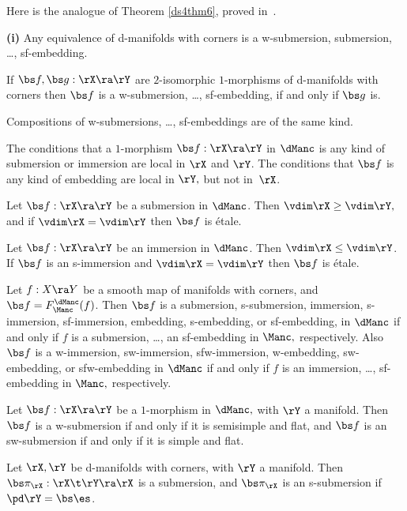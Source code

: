 \documentclass{article}
\begin{document}
Here is the analogue of Theorem \ref{ds4thm6}, proved in~\cite[\S
7.5]{Joyc6}.

\begin{thm}{\bf(i)} Any equivalence of d-manifolds with corners
is a w-sub\-mer\-sion, submersion, \ldots, sf-embedding.
\smallskip

 If\/ $\bs f,\bs g:\rX\ra\rY$ are $2$-isomorphic
$1$-morphisms of d-manifolds with corners then $\bs f$ is a
w-submersion, \ldots, sf-embedding, if and only if\/ $\bs g$ is.
\smallskip

 Compositions of w-submersions, \ldots,
sf-embeddings are of the same kind.
\smallskip

 The conditions that a $1$-morphism\/ $\bs
f:\rX\ra\rY$ in $\dManc$ is any kind of submersion or immersion are
local in $\rX$ and\/ $\rY$. The conditions that\/ $\bs f$ is any
kind of embedding are local in $\rY,$ but not in\/~$\rX$.
\smallskip

 Let\/ $\bs f:\rX\ra\rY$ be a submersion in
$\dManc$. Then\/ $\vdim\rX\ge\vdim\rY,$ and if\/ $\vdim\rX=\vdim\rY$
then\/ $\bs f$ is \'etale.
\smallskip

 Let\/ $\bs f:\rX\ra\rY$ be an immersion in
$\dManc$. Then $\vdim\rX\le\vdim\rY$. If\/ $\bs f$ is an s-immersion
and\/ $\vdim\rX=\vdim\rY$ then\/ $\bs f$ is \'etale.
\smallskip

 Let\/ $f:X\ra Y$ be a smooth map of manifolds
with corners, and\/ $\bs f=F_\Manc^\dManc(f)$. Then $\bs f$ is a
submersion, s-submersion, immersion, s-immersion, sf-immersion,
embedding, s-embedding, or sf-embedding, in $\dManc$ if and only
if\/ $f$ is a submersion, \ldots, an sf-embedding in $\Manc,$
respectively. Also $\bs f$ is a w-immersion, sw-immersion,
sfw-immersion, w-embedding, sw-embedding, or sfw-embedding in
$\dManc$ if and only if\/ $f$ is an immersion, \ldots, sf-embedding
in $\Manc,$ respectively.
\smallskip

 Let\/ $\bs f:\rX\ra\rY$ be a $1$-morphism in
$\dManc,$ with\/ $\rY$ a manifold. Then $\bs f$ is a w-submersion if
and only if it is semisimple and flat, and\/ $\bs f$ is an
sw-submersion if and only if it is simple and flat.
\smallskip

 Let\/ $\rX,\rY$ be d-manifolds with corners,
with\/ $\rY$ a manifold. Then $\bs\pi_\rX:\rX\t\rY\ra\rX$ is a
submersion, and\/ $\bs\pi_\rX$ is an s-submersion
if\/~$\pd\rY=\bs\es$.
\smallskip


\end{thm}
\end{document}
